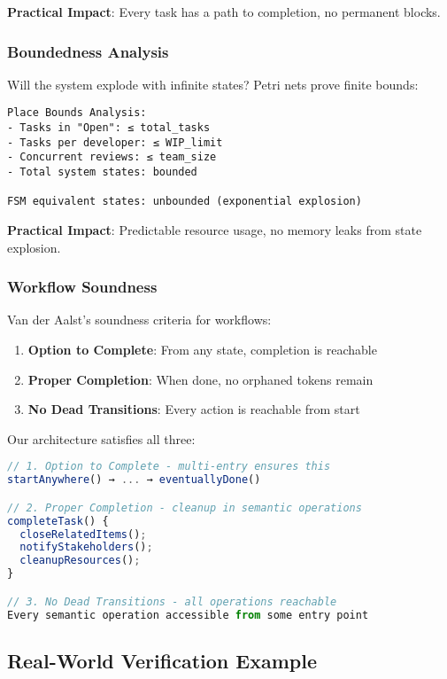 \documentclass[11pt,a4paper]{article}
\begin{document}
\textbf{Practical Impact}: Every task has a path to completion, no permanent blocks.

\subsubsection{Boundedness Analysis}

Will the system explode with infinite states? Petri nets prove finite bounds:

\begin{verbatim}
Place Bounds Analysis:
- Tasks in "Open": ≤ total_tasks
- Tasks per developer: ≤ WIP_limit
- Concurrent reviews: ≤ team_size
- Total system states: bounded

FSM equivalent states: unbounded (exponential explosion)
\end{verbatim}

\textbf{Practical Impact}: Predictable resource usage, no memory leaks from state explosion.

\subsubsection{Workflow Soundness}

Van der Aalst's soundness criteria for workflows:

\begin{enumerate}
\item \textbf{Option to Complete}: From any state, completion is reachable
\item \textbf{Proper Completion}: When done, no orphaned tokens remain  
\item \textbf{No Dead Transitions}: Every action is reachable from start
\end{enumerate}

Our architecture satisfies all three:

\begin{lstlisting}[language=JavaScript]
// 1. Option to Complete - multi-entry ensures this
startAnywhere() → ... → eventuallyDone()

// 2. Proper Completion - cleanup in semantic operations
completeTask() {
  closeRelatedItems();
  notifyStakeholders();
  cleanupResources();
}

// 3. No Dead Transitions - all operations reachable
Every semantic operation accessible from some entry point
\end{lstlisting}

\subsection{Real-World Verification Example}
\end{document}
